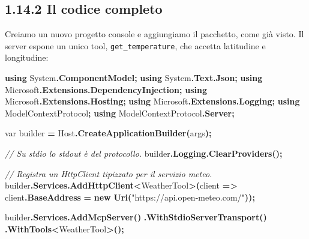 \documentclass[
  italian,
  10pt,
]{book}
\newenvironment{Shaded}{\begin{snugshade}}{\end{snugshade}}
\newcommand{\CommentTok}[1]{\textcolor[rgb]{0.56,0.35,0.01}{\textit{#1}}}
\newcommand{\DataTypeTok}[1]{\textcolor[rgb]{0.13,0.29,0.53}{#1}}
\newcommand{\FunctionTok}[1]{\textcolor[rgb]{0.13,0.29,0.53}{\textbf{#1}}}
\newcommand{\KeywordTok}[1]{\textcolor[rgb]{0.13,0.29,0.53}{\textbf{#1}}}
\newcommand{\NormalTok}[1]{#1}
\newcommand{\OperatorTok}[1]{\textcolor[rgb]{0.81,0.36,0.00}{\textbf{#1}}}
\newcommand{\StringTok}[1]{\textcolor[rgb]{0.31,0.60,0.02}{#1}}
\begin{document}
\subsection{1.14.2 Il codice completo}\label{il-codice-completo-2}

Creiamo un nuovo progetto console e aggiungiamo il pacchetto, come già
visto. Il server espone un unico tool, \texttt{get\_temperature}, che
accetta latitudine e longitudine:

\begin{Shaded}
\begin{Highlighting}[]
\KeywordTok{using}\NormalTok{ System}\OperatorTok{.}\FunctionTok{ComponentModel}\OperatorTok{;}
\KeywordTok{using}\NormalTok{ System}\OperatorTok{.}\FunctionTok{Text}\OperatorTok{.}\FunctionTok{Json}\OperatorTok{;}
\KeywordTok{using}\NormalTok{ Microsoft}\OperatorTok{.}\FunctionTok{Extensions}\OperatorTok{.}\FunctionTok{DependencyInjection}\OperatorTok{;}
\KeywordTok{using}\NormalTok{ Microsoft}\OperatorTok{.}\FunctionTok{Extensions}\OperatorTok{.}\FunctionTok{Hosting}\OperatorTok{;}
\KeywordTok{using}\NormalTok{ Microsoft}\OperatorTok{.}\FunctionTok{Extensions}\OperatorTok{.}\FunctionTok{Logging}\OperatorTok{;}
\KeywordTok{using}\NormalTok{ ModelContextProtocol}\OperatorTok{;}
\KeywordTok{using}\NormalTok{ ModelContextProtocol}\OperatorTok{.}\FunctionTok{Server}\OperatorTok{;}

\DataTypeTok{var}\NormalTok{ builder }\OperatorTok{=}\NormalTok{ Host}\OperatorTok{.}\FunctionTok{CreateApplicationBuilder}\OperatorTok{(}\NormalTok{args}\OperatorTok{);}

\CommentTok{// Su stdio lo stdout è del protocollo.}
\NormalTok{builder}\OperatorTok{.}\FunctionTok{Logging}\OperatorTok{.}\FunctionTok{ClearProviders}\OperatorTok{();}

\CommentTok{// Registra un HttpClient tipizzato per il servizio meteo.}
\NormalTok{builder}\OperatorTok{.}\FunctionTok{Services}\OperatorTok{.}\FunctionTok{AddHttpClient}\OperatorTok{\textless{}}\NormalTok{WeatherTool}\OperatorTok{\textgreater{}(}\NormalTok{client }\OperatorTok{=\textgreater{}}
\NormalTok{    client}\OperatorTok{.}\FunctionTok{BaseAddress} \OperatorTok{=} \KeywordTok{new} \FunctionTok{Uri}\OperatorTok{(}\StringTok{"https://api.open{-}meteo.com/"}\OperatorTok{));}

\NormalTok{builder}\OperatorTok{.}\FunctionTok{Services}\OperatorTok{.}\FunctionTok{AddMcpServer}\OperatorTok{()}
    \OperatorTok{.}\FunctionTok{WithStdioServerTransport}\OperatorTok{()}
    \OperatorTok{.}\FunctionTok{WithTools}\OperatorTok{\textless{}}\NormalTok{WeatherTool}\OperatorTok{\textgreater{}();}


\end{Highlighting}
\end{Shaded}
\end{document}
